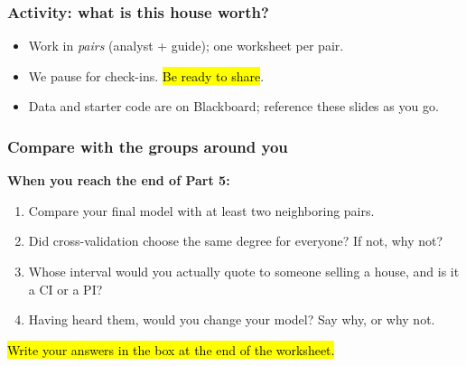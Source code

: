 \documentclass[slidestop,compress,mathserif]{beamer}
\begin{document}
\begin{frame}
\frametitle{Activity: what is this house worth?}


\vspace{0.3em}
{\small
\begin{itemize}
\item Work in \emph{pairs} (analyst + guide); one worksheet per pair.
\item We pause for check-ins. \hl{Be ready to share}.
\item Data and starter code are on Blackboard; reference these slides as you go.
\end{itemize}}

\end{frame}


\begin{frame}
\frametitle{Compare with the groups around you}

\textbf{When you reach the end of Part 5:}

\vspace{0.3em}
\begin{enumerate}
\item Compare your final model with at least two neighboring pairs.
\item Did cross-validation choose the same degree for everyone? If not, why not?
\item Whose interval would you actually quote to someone selling a house, and is it a CI or a PI?
\item Having heard them, would you change your model? Say why, or why not.
\end{enumerate}

\vspace{0.5em}
\hl{Write your answers in the box at the end of the worksheet.}

\end{frame}


\end{document}
